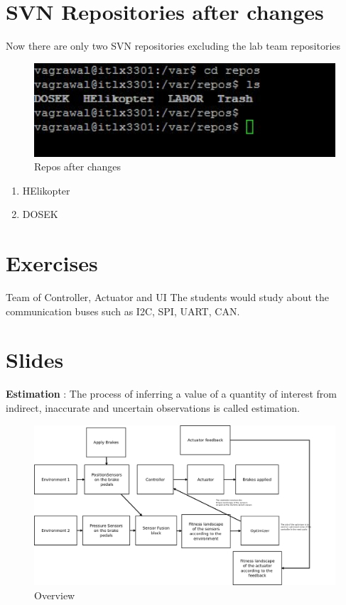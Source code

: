 \section{SVN Repositories after changes}Now there are only two SVN
repositories excluding the lab team repositories\\
\begin{figure}[H]
\begin{center}
\includegraphics[width=1.0\textwidth]{images/svn_repos_after.jpg} 
\caption{Repos after changes}
\label{fig:SVNAfter}
\end{center}
\end{figure}
\begin{enumerate}
  \item HElikopter
  \item DOSEK
\end{enumerate}



\section{Exercises}
Team of Controller, Actuator and UI 
The students would study about the communication buses such as I2C, SPI, UART,
CAN.

\section{Slides}
\textbf{Estimation} : The process of inferring a value of a quantity of interest
from indirect, inaccurate and uncertain observations is called estimation.



\begin{figure}[H]
\begin{center}
\includegraphics[width=1.0\textwidth]{images/second.png}
\caption{Overview}
\label{fig:Overview}
\end{center}
\end{figure}

